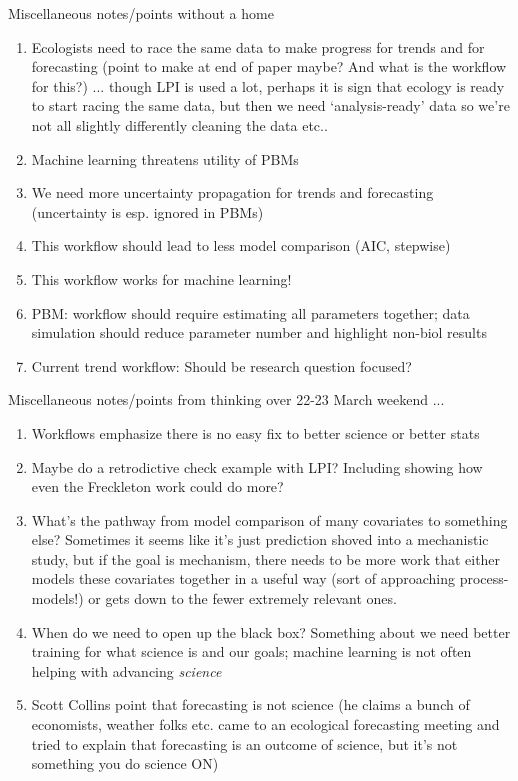 \documentclass[11pt]{article}
\begin{document}
Miscellaneous notes/points without a home
\begin{enumerate}
\item Ecologists need to race the same data to make progress for trends and for forecasting (point to make at end of paper maybe? And what is the workflow for this?) ... though LPI is used a lot, perhaps it is  sign that ecology is ready to start racing the same data, but then we need `analysis-ready' data so we're not all slightly differently cleaning the data etc..
\item Machine learning threatens utility of PBMs
\item We need more uncertainty propagation for trends and forecasting (uncertainty is esp. ignored in PBMs)
\item This workflow should lead to less model comparison (AIC, stepwise)
\item This workflow works for machine learning!
\item PBM: workflow should require estimating all parameters together; data simulation should reduce parameter number and highlight non-biol results
\item Current trend workflow: Should be research question focused?
\end{enumerate}

Miscellaneous notes/points from thinking over 22-23 March weekend ...
\begin{enumerate}
\item Workflows emphasize there is no easy fix to better science or better stats
\item Maybe do a retrodictive check example with LPI? Including showing how even the Freckleton work could do more? 
\item What's the pathway from model comparison of many covariates to something else? Sometimes it seems like it's just prediction shoved into a mechanistic study, but if the goal is mechanism, there needs to be more work that either models these covariates together in a useful way (sort of approaching process-models!) or gets down to the fewer extremely relevant ones. 
\item When do we need to open up the black box? Something about we need better training for what science is and our goals; machine learning is not often helping with advancing \emph{science}
\item Scott Collins point that forecasting is not science (he claims a bunch of economists, weather folks etc. came to an ecological forecasting meeting and tried to explain that forecasting is an outcome of science, but it's not something you do science ON)
\end{enumerate}
\end{document}
